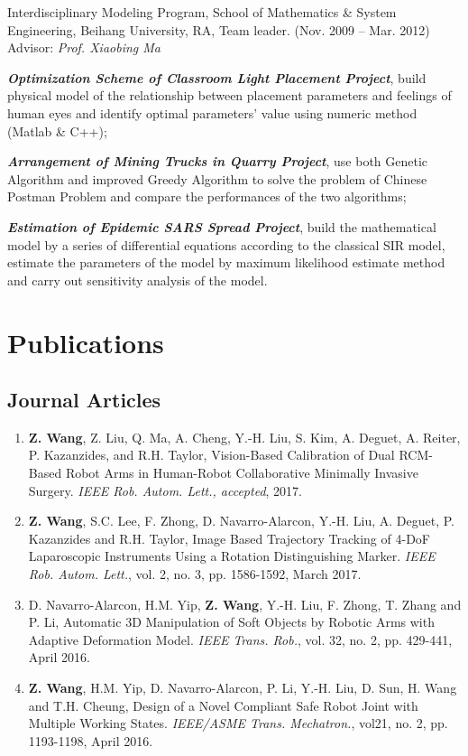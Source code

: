 \documentclass[10pt,letterpaper]{article}
\renewenvironment{itemize}{
\begin{list}{}{
    \setlength{\leftmargin}{1.5em}
    \setlength{\itemsep}{0.25em}
    \setlength{\parskip}{0pt}
    \setlength{\parsep}{0.25em}
    }
    }{
\end{list}
}
\begin{document}
\begin{itemize}
    \item Interdisciplinary Modeling Program, School of Mathematics \& System Engineering, Beihang University, RA, Team leader. (Nov. 2009 -- Mar. 2012) \\
    Advisor: \textit{Prof. Xiaobing Ma}
    \begin{itemize}
        \item \textbf{\textit{Optimization Scheme of Classroom Light Placement Project}}, build physical model of the relationship between placement parameters and feelings of human eyes and identify optimal parameters' value using numeric method (Matlab \& C++);
        \item \textit{\textbf{Arrangement of Mining Trucks in Quarry Project}}, use both Genetic Algorithm and improved Greedy Algorithm to solve the problem of Chinese Postman Problem and compare the performances of the two algorithms;
        \item \textbf{\textit{Estimation of Epidemic SARS Spread Project}}, build the mathematical model by a series of differential equations according to the classical SIR model, estimate the parameters of the model by maximum likelihood estimate method and carry out sensitivity analysis of the model.
    \end{itemize}
\end{itemize}

\newpage
\section*{Publications}

\subsection*{Journal Articles}
\begin{enumerate}
    \item \textbf{Z. Wang}, Z. Liu, Q. Ma, A. Cheng, Y.-H. Liu, S. Kim, A. Deguet, A. Reiter, P. Kazanzides, and R.H. Taylor,
    Vision-Based Calibration of Dual RCM-Based Robot Arms in Human-Robot Collaborative Minimally Invasive Surgery.
    \textit{IEEE Rob. Autom. Lett., accepted}, 2017.
    \item \textbf{Z. Wang}, S.C. Lee, F. Zhong, D. Navarro-Alarcon, Y.-H. Liu, A. Deguet, P. Kazanzides and R.H. Taylor,
    Image Based Trajectory Tracking of 4-DoF Laparoscopic Instruments Using a Rotation Distinguishing Marker.
    \textit{IEEE Rob. Autom. Lett.}, vol. 2, no. 3, pp. 1586-1592, March 2017.
    \item D. Navarro-Alarcon, H.M. Yip, \textbf{Z. Wang}, Y.-H. Liu, F. Zhong, T. Zhang and P. Li,
    Automatic 3D Manipulation of Soft Objects by Robotic Arms with Adaptive Deformation Model.
    \textit{{IEEE} Trans. Rob.}, vol. 32, no. 2, pp. 429-441, April 2016.
    \item \textbf{Z. Wang}, H.M. Yip, D. Navarro-Alarcon, P. Li, Y.-H. Liu, D. Sun, H. Wang and T.H. Cheung,
    Design of a Novel Compliant Safe Robot Joint with Multiple Working States.
    \textit{{IEEE/ASME} Trans. Mechatron.}, vol21, no. 2, pp. 1193-1198, April 2016.
\end{enumerate}
\end{document}
